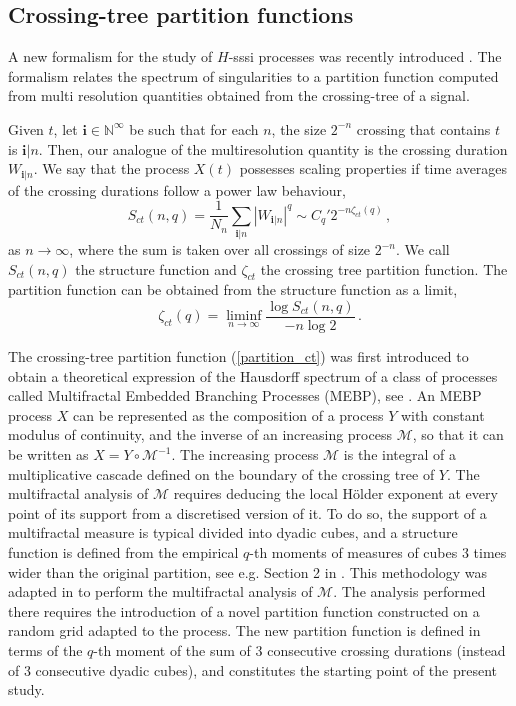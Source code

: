 \documentclass[a4paper]{article}
\newcommand{\calM}{\mathcal{M}}
\newcommand{\N}{\mathbb{N}}
\newcommand{\bfi}{\mathbf{i}}
\begin{document}
\subsection{Crossing-tree partition functions}
\label{ssec:ctform}

A new formalism for the study of $H$-sssi processes was recently introduced \cite{DecrAJ13, DecrA15}. 
The formalism relates the spectrum of singularities to a partition function computed from multi resolution quantities obtained from the crossing-tree of a signal.

Given $t$, let $\bfi \in \N^\infty$ be such that for each $n$, the size $2^{-n}$ crossing that contains $t$ is $\bfi|n$.
Then, our analogue of the multiresolution quantity is the crossing duration $W_{\bfi|n}$.
We say that the process $X(t)$ possesses scaling properties if time averages of the crossing durations follow a power law behaviour,
\begin{equation}\label{structure_ct}
S_{ct}(n,q) = \frac{1}{N_n}\sum\limits_{\bfi|n} |W_{\bfi|n}|^q \sim C_q' 2^{-n\zeta_{ct}(q)}\,,
\end{equation}
as $n\to \infty$,
where the sum is taken over all crossings of size $2^{-n}$.
We call $S_{ct}(n,q)$ the structure function and $\zeta_{ct}$ the crossing tree partition function.
The partition function can be obtained from the structure function as a limit,  
\begin{equation}\label{partition_ct}
\zeta_{ct}(q) = \liminf_{n\to \infty}\frac{\log S_{ct}(n,q)}{-n \log 2}\,.
\end{equation}

The crossing-tree partition function (\ref{partition_ct}) was first introduced to obtain a theoretical expression of the Hausdorff spectrum of a class of processes called Multifractal Embedded Branching Processes (MEBP), see \cite{DecrJ12, DecrHJ}.
An MEBP process $X$ can be represented as the composition of a process $Y$ with constant modulus of continuity, and the inverse of an increasing process $\calM$, so that it can be written as $X = Y \circ \calM^{-1}$.
The increasing process $\calM$ is the integral of a multiplicative cascade defined on the boundary of the crossing tree of $Y$.
The multifractal analysis of $\calM$ requires deducing the local H\"older exponent at every point of its support from a discretised version of it. To do so, the support of a multifractal measure is typical divided into dyadic cubes, and a structure function is defined from the empirical $q$-th moments of measures
of cubes 3 times wider than the original partition, see e.g. Section 2 in \cite{JaffLA06}. This methodology was adapted in \cite{DecrHJ} to perform the multifractal analysis of $\calM$. 
The analysis performed there requires the introduction of a novel partition function constructed on a random grid adapted to the process. The new partition function is defined in terms of the $q$-th moment of the sum of 3 consecutive crossing durations (instead of 3 consecutive dyadic cubes), and constitutes the starting point of the present study.
\end{document}
